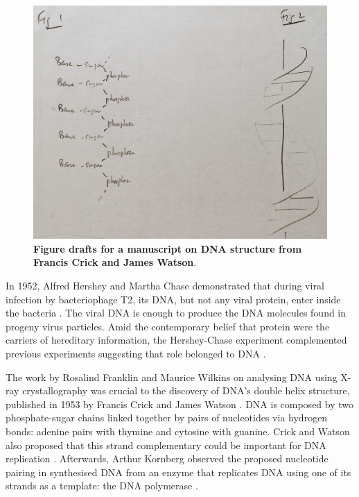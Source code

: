 \begin{figure}
  \vspace{-\intextsep}
  \includegraphics[width=\linewidth]{images/intro/dna_structure_draft_cropped}
  \caption[Figure drafts for a manuscript on DNA structure]{\textbf{Figure drafts for a manuscript on DNA structure from Francis Crick and James Watson}.}
  \label{fig:dna-structure}
  \vspace{-\intextsep}
\end{figure}

In 1952, Alfred Hershey and Martha Chase demonstrated that during viral infection by bacteriophage T2, its DNA, but not any viral protein, enter inside the bacteria \cite{hershey:1952wo}. The viral DNA is enough to produce the DNA molecules found in progeny virus particles. Amid the contemporary belief that protein were the carriers of hereditary information, the Hershey-Chase experiment complemented previous experiments suggesting that role belonged to DNA \cite{hershey:1952wo}.

The work by Rosalind Franklin and Maurice Wilkins on analysing DNA using X-ray crystallography was crucial to the discovery of DNA's double helix structure, published in 1953 by Francis Crick and James Watson \cite{watson:1953ug}. DNA is composed by two phosphate-sugar chains linked together by pairs of nucleotides via hydrogen bonds: adenine pairs with thymine and cytosine with guanine. Crick and Watson also proposed that this strand complementary could be important for DNA replication \cite{watson:1953ug}. Afterwards, Arthur Kornberg observed the proposed nucleotide pairing in synthesised DNA from an enzyme that replicates DNA using one of its strands as a template: the DNA polymerase \cite{kornberg:1956wk}.

